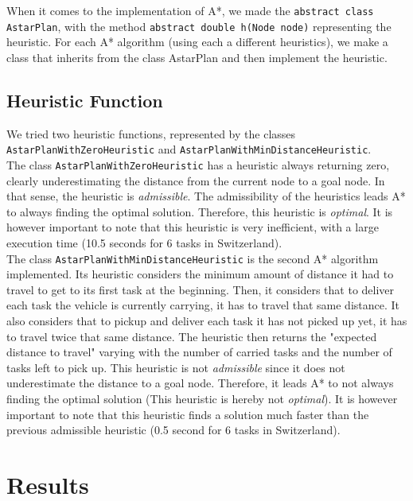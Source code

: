 \documentclass[11pt]{article}
\begin{document}
When it comes to the implementation of A*, we made the \texttt{abstract class AstarPlan}, with the method \texttt{abstract double h(Node node)} representing the heuristic. For each A* algorithm (using each a different heuristics), we make a class that inherits from\textsl{} the class AstarPlan and then implement the heuristic. 

\subsection{Heuristic Function}
We tried two heuristic functions, represented by the classes \texttt{AstarPlanWithZeroHeuristic} and \texttt{AstarPlanWithMinDistanceHeuristic}.\\

The class \texttt{AstarPlanWithZeroHeuristic} has a heuristic always returning zero, clearly underestimating the distance from the current node to a goal node. In that sense, the heuristic is \textit{admissible}. The admissibility of the heuristics leads A* to always finding the optimal solution. Therefore, this heuristic is \textit{optimal}. It is however important to note that this heuristic is very inefficient, with a large execution time (10.5 seconds for 6 tasks in Switzerland).\\

The class \texttt{AstarPlanWithMinDistanceHeuristic} is the second A* algorithm implemented. Its heuristic considers the minimum amount of distance it had to travel to get to its first task at the beginning. Then, it considers that to deliver each task the vehicle is currently carrying, it has to travel that same distance. It also considers that to pickup and deliver each task it has not picked up yet, it has to travel twice that same distance. The heuristic then returns the "expected distance to travel" varying with the number of carried tasks and the number of tasks left to pick up. This heuristic is not \textit{admissible} since it does not underestimate the distance to a goal node. Therefore, it leads A* to not always finding the optimal solution (This heuristic is hereby not \textit{optimal}). It is however important to note that this heuristic finds a solution much faster than the previous admissible heuristic (0.5 second for 6 tasks in Switzerland).

\section{Results}
\end{document}
